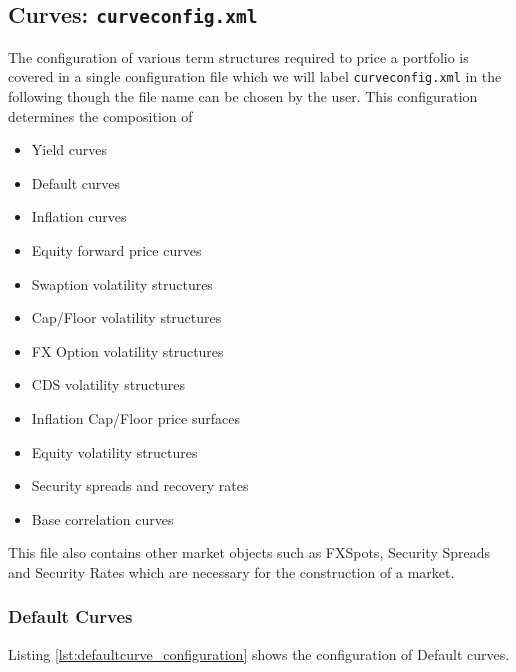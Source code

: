 \documentclass[12pt, a4paper]{article}
\begin{document}
\subsection{Curves: {\tt curveconfig.xml}}\label{sec:curveconfig}

The configuration of various term structures required to price a portfolio is covered in a single configuration file
which we will label {\tt curveconfig.xml} in the following though the file name can be chosen by the user. This
configuration determines the composition of 
\begin{itemize}
\item Yield curves %
\item Default curves %
\item Inflation curves %
\item Equity forward price curves %
\item Swaption volatility structures %
\item Cap/Floor volatility structures %
\item FX Option volatility structures %
\item CDS volatility structures %
\item Inflation Cap/Floor price surfaces %
\item Equity volatility structures %
\item Security spreads and recovery rates %
\item Base correlation curves %
\end{itemize}

This file also contains other market objects such as FXSpots, Security Spreads and Security Rates which are necessary
for the construction of a market.
 


\subsubsection{Default Curves}

Listing \ref{lst:defaultcurve_configuration} shows the configuration of Default curves.
\end{document}
